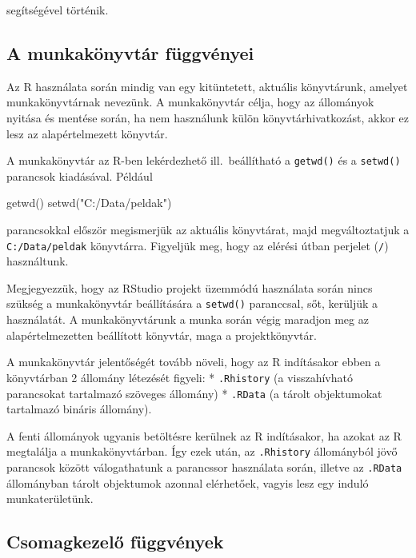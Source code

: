 \documentclass[
]{book}
\newenvironment{Shaded}{\begin{snugshade}}{\end{snugshade}}
\newcommand{\FunctionTok}[1]{\textcolor[rgb]{0.00,0.00,0.00}{#1}}
\newcommand{\NormalTok}[1]{#1}
\newcommand{\StringTok}[1]{\textcolor[rgb]{0.31,0.60,0.02}{#1}}
\begin{document}
segítségével történik.

\hypertarget{a-munkakuxf6nyvtuxe1r-fuxfcggvuxe9nyei}{%
\subsection{A munkakönyvtár függvényei}\label{a-munkakuxf6nyvtuxe1r-fuxfcggvuxe9nyei}}

Az R használata során mindig van egy kitüntetett, aktuális könyvtárunk, amelyet munkakönyvtárnak nevezünk. A munkakönyvtár célja, hogy az állományok nyitása és mentése során, ha nem használunk külön könyvtárhivatkozást, akkor ez lesz az alapértelmezett könyvtár.

A munkakönyvtár az R-ben lekérdezhető ill.~beállítható a \texttt{getwd()} és a \texttt{setwd()} parancsok kiadásával. Például

\begin{Shaded}
\begin{Highlighting}[]
\FunctionTok{getwd}\NormalTok{()}
\FunctionTok{setwd}\NormalTok{(}\StringTok{"C:/Data/peldak"}\NormalTok{)}
\end{Highlighting}
\end{Shaded}

parancsokkal először megismerjük az aktuális könyvtárat, majd megváltoztatjuk a \texttt{C:/Data/peldak} könyvtárra. Figyeljük meg, hogy az elérési útban perjelet (\texttt{/}) használtunk.

Megjegyezzük, hogy az RStudio projekt üzemmódú használata során nincs szükség a munkakönyvtár beállítására a \texttt{setwd()} paranccsal, sőt, kerüljük a használatát. A munkakönyvtárunk a munka során végig maradjon meg az alapértelmezetten beállított könyvtár, maga a projektkönyvtár.

A munkakönyvtár jelentőségét tovább növeli, hogy az R indításakor ebben a könyvtárban 2 állomány létezését figyeli:
* \texttt{.Rhistory} (a visszahívható parancsokat tartalmazó szöveges állomány)
* \texttt{.RData} (a tárolt objektumokat tartalmazó bináris állomány).

A fenti állományok ugyanis betöltésre kerülnek az R indításakor, ha azokat az R megtalálja a munkakönyvtárban. Így ezek után, az \texttt{.Rhistory} állományból jövő parancsok között válogathatunk a parancssor használata során, illetve az \texttt{.RData} állományban tárolt objektumok azonnal elérhetőek, vagyis lesz egy induló munkaterületünk.

\hypertarget{csomagkezelux151-fuxfcggvuxe9nyek}{%
\subsection{Csomagkezelő függvények}\label{csomagkezelux151-fuxfcggvuxe9nyek}}
\end{document}
